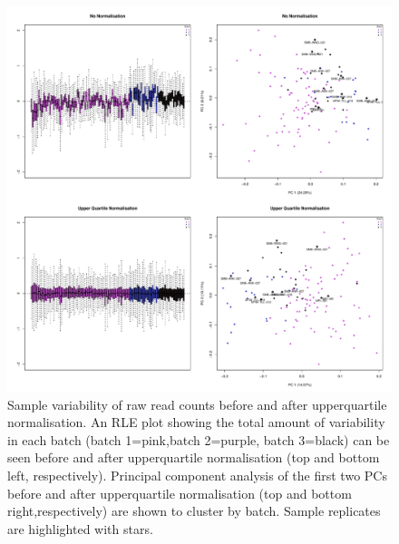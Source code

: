 \documentclass[12pt,a4paper,titlepage,twoside,openright]{book}
\begin{document}
\begin{mainmatter}
{{\begin{figure}[htb!]
\centering
\includegraphics[width=\textwidth,height=\textheight,keepaspectratio]{Figures/Normalisation_beforeandAfterUQnorm.pdf}
\caption{Sample variability of raw read counts before and after upperquartile normalisation. An RLE plot showing the total amount of variability in each batch (batch 1=pink,batch 2=purple, batch 3=black) can be seen before and after upperquartile normalisation (top and bottom left, respectively). Principal component analysis of the first two PCs before and after upperquartile normalisation (top and bottom right,respectively) are shown to cluster by batch. Sample replicates are highlighted with stars.}
\label{fig:UQ normalisation}
\end{figure}

}}
\end{mainmatter}
\end{document}

